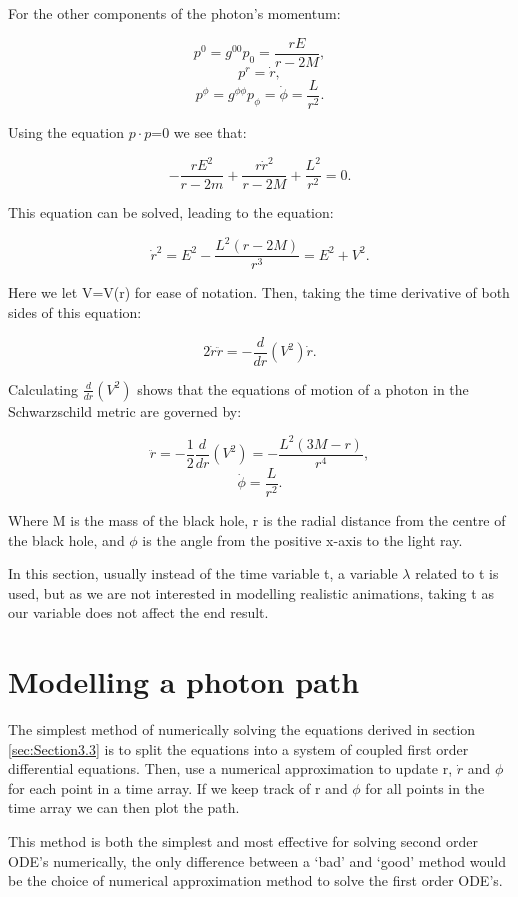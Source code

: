 \documentclass[oneside,openright,frontopenright, singlespacing]{dmathesis}
\begin{document}
\vspace{1em}
	For the other components of the photon's momentum:

	\[p^0 = g^{00}p_0 = \frac{rE}{r-2M},\]
	\[p^r = \dot{r},\]
	\[p^\phi = g^{\phi\phi}p_\phi = \dot{\phi} = \frac{L}{r^2}.\]

	Using the equation $p \cdot p$=0 we see that:

	\[-\frac{rE^2}{r-2m}+\frac{r\dot{r}^2}{r-2M}+\frac{L^2}{r^2}=0.\]

	This equation can be solved, leading to the equation:

	\[\dot{r}^2 = E^2-\frac{L^2(r-2M)}{r^3} = E^2 + V^2.\]

	Here we let V=V(r) for ease of notation. Then, taking the time derivative of both sides of this equation:

	\[2\dot{r}\ddot{r} = -\frac{d}{dr}(V^2)\dot{r}.\]

	Calculating $\frac{d}{dr}(V^2)$ shows that the equations of motion of a photon in the Schwarzschild metric are governed by:

	\[\ddot{r} = -\frac{1}{2}\frac{d}{dr}(V^2) = -\frac{L^2(3M-r)}{r^4},\]
	\[\dot{\phi}=\frac{L}{r^2}.\]

	Where M is the mass of the black hole, r is the radial distance from the centre of the black hole, and $\phi$ is the angle from the positive x-axis to the light ray.

\vspace{1em}
	In this section, usually instead of the time variable t, a variable $\lambda$ related to t is used, but as we are not interested in modelling realistic animations, taking t as our variable does not affect the end result.

\section{Modelling a photon path}\label{sec:Section3.4}

	The simplest method of numerically solving the equations derived in section \ref{sec:Section3.3} is to split the equations into a system of coupled first order differential equations. Then, use a numerical approximation to update r, $\dot{r}$ and $\phi$ for each point in a time array. If we keep track of r and $\phi$ for all points in the time array we can then plot the path.

\vspace{1em}
	This method is both the simplest and most effective for solving second order ODE’s numerically, the only difference between a ‘bad’ and ‘good’ method would be the choice of numerical approximation method to solve the first order ODE’s.
\end{document}

